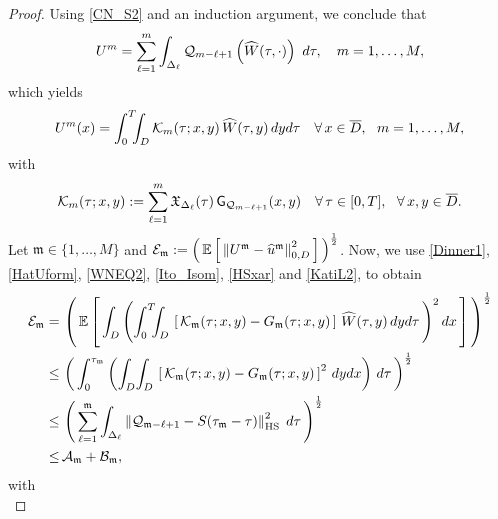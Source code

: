 \documentclass[10pt]{amsart}
\numberwithin{equation}{section}
\begin{document}
\begin{proof}
Using \eqref{CN_S2} and an induction argument, we conclude that
\begin{equation*}
U^m=\sum_{\ell=1}^{{\scriptscriptstyle} m}
\int_{{\scriptscriptstyle}\Delta_{\ell}}{\mathcal Q}_{m-\ell+1}\left({\widehat
W}(\tau,\cdot)\right)\,\,d\tau, \quad m=1,\dots,M,
\end{equation*}
which yields
\begin{equation}\label{Dinner1}
U^m(x) =\int_0^{{\scriptscriptstyle} T}\!\!\!\int_{{\scriptscriptstyle} D}
{\mathcal K}_m(\tau;x,y)\,{\widehat W}(\tau,y)\,dyd\tau
\quad\forall\,x\in{\overline D}, {\ \ } m=1,\dots,M,
\end{equation}
with
\begin{equation*}
{\mathcal K}_m(\tau;x,y):=\sum_{\ell=1}^{m}
{\mathfrak X}_{{\scriptscriptstyle}\Delta_{\ell}}(\tau) \,{\sf G}_{{\scriptscriptstyle}{\mathcal Q}_{m-\ell+1}}(x,y)
\quad\forall\,\tau\in[0,T],{\ \ }\forall\,x,y\in{\overline D}.
\end{equation*}
Let ${\mathfrak m}\in\{1,\dots,M\}$ and 
${\mathcal E}_{\mathfrak m}:=\left(\,{\mathbb
E}\left[\,\left\|U^{\mathfrak m}-{\widehat u}^{\mathfrak m}
\right\|_{{\scriptscriptstyle} 0,D}^2\,\right]\,\right)^{\frac{1}{2}}$.
Now, we use \eqref{Dinner1}, \eqref{HatUform}, \eqref{WNEQ2}, \eqref{Ito_Isom},
\eqref{HSxar} and \eqref{KatiL2}, to obtain
\begin{equation}\label{EMP_2010_2}
\begin{split}
{\mathcal E}_{\mathfrak m}=&\,\left(\,{\mathbb E}\left[\,\int_{{\scriptscriptstyle} D}\left(
\int_0^{{\scriptscriptstyle} T}\!\!\!\int_{{\scriptscriptstyle} D}
\,\left[\,{\mathcal K}_{\mathfrak m}(\tau;x,y)
-G_{\mathfrak m}(\tau;x,y)\,\right]\,
{\widehat W}(\tau,y)\,dyd\tau\,\right)^2dx\,\right]\,\right)^{\frac{1}{2}}\\
\leq&\,\left(\,\int_0^{\tau_{\mathfrak m}}\left(\int_{{\scriptscriptstyle} D}\!\int_{{\scriptscriptstyle} D}
\,\left[\,{\mathcal K}_{\mathfrak m}(\tau;x,y)
-G_{\mathfrak m}(\tau;x,y)\,\right]^2\,dydx\right)\,d\tau\,\right)^{\frac{1}{2}}\\
\leq&\,\left(\,\sum_{\ell=1}^{\mathfrak m}\int_{{\scriptscriptstyle}\Delta_{\ell}}
\left\|{\mathcal Q}_{{\mathfrak m}-\ell+1}
-S(\tau_{\mathfrak m}-\tau)\right\|_{{\scriptscriptstyle}\rm HS}^2\;d\tau\,\right)^{\frac{1}{2}}\\
\leq&\,{\mathcal A}_{\mathfrak m}+{\mathcal B}_{\mathfrak m},
\end{split}
\end{equation}
with
\begin{equation*}

\end{equation*}
\end{proof}
\end{document}
